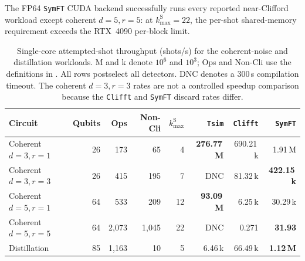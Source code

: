 \documentclass[a4paper,onecolumn,unpublished]{quantumarticle}
\newcommand{\cref}[1]{\zcref{#1}}
\newcommand{\tFont}[1]{\texttt{#1}}
\newcommand{\symft}{\tFont{SymFT}}
\newcommand{\tsim}{\tFont{Tsim}}
\newcommand{\clifft}{\tFont{Clifft}}
\begin{document}
The FP64 \symft{} CUDA backend successfully runs every reported near-Clifford workload except coherent $d=5,r=5$: at $k_{\max}^{\mathrm S}=22$, the per-shot shared-memory requirement exceeds the RTX~4090 per-block limit.

\begin{table}[H]
    \centering
    \setlength{\tabcolsep}{3.5pt}
    \caption{Single-core attempted-shot throughput (shots/s) for the coherent-noise and distillation workloads.
    M and k denote $10^6$ and $10^3$; Ops and Non-Cli use the definitions in \cref{tab:benchmark-msc-cpu}.
    All rows postselect all detectors.
    DNC denotes a 300\,s compilation timeout.
    The coherent $d=3,r=3$ rates are not a controlled speedup comparison because the \clifft{} and \symft{} discard rates differ.}
    \label{tab:benchmark-coherent-cpu}
    \begin{tabular}{lrrrr|rrr}
        \toprule
        Circuit & Qubits & Ops & Non-Cli & $k_{\max}^{\mathrm S}$ & \tsim{} & \clifft{} & \symft{} \\
        \midrule
        Coherent $d=3,r=1$ & 26 & 173 & 65 & 4
            & \textbf{276.77\,M} & 690.21\,k & 1.91\,M \\
        Coherent $d=3,r=3$ & 26 & 415 & 195 & 7
            & DNC & 81.32\,k & \textbf{422.15\,k} \\
        Coherent $d=5,r=1$ & 64 & 533 & 209 & 12
            & \textbf{93.09\,M} & 6.25\,k & 30.29\,k \\
        Coherent $d=5,r=5$ & 64 & 2{,}073 & 1{,}045 & 22
            & DNC & 0.271 & \textbf{31.93} \\
        Distillation & 85 & 1{,}163 & 10 & 5
            & 6.46\,k & 66.49\,k & \textbf{1.12\,M} \\
        \bottomrule
    \end{tabular}
\end{table}
\end{document}
